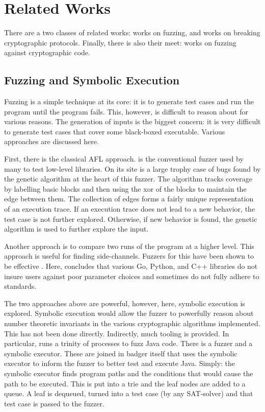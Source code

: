 \documentclass[letterpaper,twocolumn,10pt]{article}
\begin{document}
\section{Related Works}

There are a two classes of related works: works on fuzzing, and works on breaking
cryptographic protocols. Finally, there is also their meet: works on fuzzing against
cryptographic code.

\subsection{Fuzzing and Symbolic Execution}

Fuzzing is a simple technique at its core: it is
to generate test cases and run the program until
the program fails. This, however, is difficult to
reason about for various reasons. The generation of
inputs is the biggest concern: it is very difficult to
generate test cases that cover some black-boxed executable.
Various approaches are discussed here.

First, there is the classical AFL approach. \cite{AFL}
is the conventional fuzzer used by many to test low-level
libraries. On its site is a large trophy case of bugs found
by the genetic algorithm at the heart of this fuzzer. The algorithm
tracks coverage by labelling basic blocks and then using the xor
of the blocks to maintain the edge between them. The collection
of edges forms a fairly unique representation of an execution trace.
If an execution trace does not lead to a new behavior, the test case
is not further explored. Otherwise, if new behavior is found, the genetic
algorithm is used to further explore the input.

Another approach is to compare two runs of the program at a higher
level. This approach is useful for finding side-channels. Fuzzers
for this have been shown to be effective \cite{diffFuzz} \cite{cdf}.
Here, \cite{cdf} concludes that various Go, Python, and C++ libraries
do not insure users against poor parameter choices and sometimes do not
fully adhere to standards.

The two approaches above are powerful, however, here, symbolic execution
is explored. Symbolic execution would allow the fuzzer to powerfully reason
about number theoretic invariants in the various cryptographic algorithms
implemented. This has not been done directly. Indirectly, much tooling is
provided. In particular, \cite{badger} runs a trinity of processes to fuzz
Java code. There is a fuzzer and a symbolic executor. These are joined in
badger itself that uses the symbolic executor to inform the fuzzer to better
test and execute Java. Simply: the symbolic executor finds program paths
and the conditions that would cause the path to be executed. This is put
into a trie and the leaf nodes are added to a queue. A leaf is dequeued,
turned into a test case (by any SAT-solver) and that test case is passed
to the fuzzer.
\end{document}
